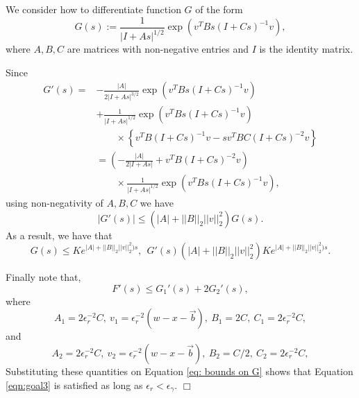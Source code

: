 \documentclass[12pt]{article}
\newenvironment {proof}{{\noindent\bf Proof }}{\hfill $\Box$ \medskip}
\newcommand{\meanq}{\vec b}    %
\newcommand{\covq}{C}     %
\begin{document}
\begin{proof}
We consider how to differentiate function $G$ of the form 
$$G(s):=\frac{1}{|I+As|^{1/2}}\exp(v^{T}Bs(I+Cs)^{-1}v),$$
where $A,B,C$ are matrices with non-negative entries and $I$ is the identity matrix.

Since 
\begin{equation}
\begin{aligned}
G'(s)=& - \frac{|A|}{2|I+As|^{3/2}}\exp(v^{T}Bs(I+Cs)^{-1}v)\\
      & + \frac{1}{|I+As|^{1/2}}\exp(v^{T}Bs(I+Cs)^{-1}v)\\
      & \qquad \times \left\{ v^{T}B(I+Cs)^{-1}v
                            - sv^{T}BC(I+Cs)^{-2}v
                    \right\}\\
      &=\left(- \frac{|A|}{2|I+As|}+v^{T}B(I+Cs)^{-2}v
        \right)\\
      & \qquad \times
        \frac{1}{|I+As|^{1/2}}\exp(v^{T}Bs(I+Cs)^{-1}v),
\end{aligned}
\end{equation}
using non-negativity of $A,B,C$ we have
\begin{equation}
\label{eq: bounds on G'}
|G'(s)| \leq (|A|+||B||_{2}||v||_2^2)G(s).    
\end{equation}
As a result, we have that 
\begin{equation}
\label{eq: bounds on G}
G(s) \leq K e^{|A|+||B||_{2}||v||_2^2)s}, ~~   G'(s)(|A|+||B||_{2}||v||_2^2)K e^{|A|+||B||_{2}||v||_2^2)s}.  
\end{equation}

Finally note that, 
$$F'(s) \leq G_1'(s)+2G_2'(s),$$
where 
$$A_1= 2\epsilon_r^{-2} \covq, ~ v_1=\epsilon_r^{-2}(w-x-\meanq), ~B_1 = 2\covq, ~C_1=2\epsilon_r^{-2} \covq,$$
and 
$$A_2= 2\epsilon_r^{-2} \covq, ~ v_2=\epsilon_r^{-2}(w-x-\meanq), ~B_2 = \covq/2, ~C_2=2\epsilon_r^{-2} \covq,$$
Substituting these quantities on Equation \eqref{eq: bounds on G} shows that Equation \eqref{eqn:goal3} is satisfied as long as $\epsilon_r < \epsilon_\gamma$.
\end{proof}
\end{document}
